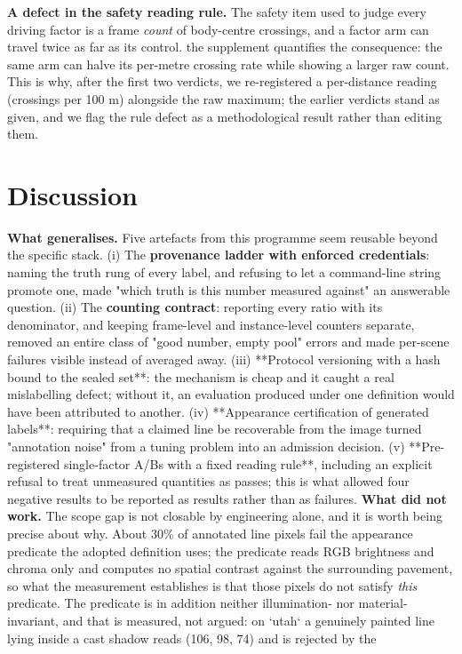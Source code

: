 \documentclass[journal]{IEEEtran}
\begin{document}
\textbf{A defect in the safety reading rule.} The safety item used to judge every driving factor is a frame
\emph{count} of body-centre crossings, and a factor arm can travel twice as far as its control. the supplement
quantifies the consequence: the same arm can halve its per-metre crossing rate while showing a larger
raw count. This is why, after the first two verdicts, we re-registered a per-distance reading
(crossings per 100 m) alongside the raw maximum; the earlier verdicts stand as given, and we flag the
rule defect as a methodological result rather than editing them.
\section{Discussion}
\textbf{What generalises.} Five artefacts from this programme seem reusable beyond the specific stack.
(i) The \textbf{provenance ladder with enforced credentials}: naming the truth rung of every label, and refusing
to let a command-line string promote one, made "which truth is this number measured against" an answerable
question. (ii) The \textbf{counting contract}: reporting every ratio with its denominator, and keeping frame-level
and instance-level counters separate, removed an entire class of "good number, empty pool" errors and made
per-scene failures visible instead of averaged away. (iii) **Protocol versioning with a hash bound to the
sealed set**: the mechanism is cheap and it caught a real mislabelling defect; without it, an evaluation
produced under one definition would have been attributed to another. (iv) **Appearance certification of
generated labels**: requiring that a claimed line be recoverable from the image turned "annotation noise"
from a tuning problem into an admission decision. (v) **Pre-registered single-factor A/Bs with a fixed
reading rule**, including an explicit refusal to treat unmeasured quantities as passes; this is what allowed
four negative results to be reported as results rather than as failures.
\textbf{What did not work.} The scope gap is not closable by engineering alone, and it is worth being precise
about why. About 30\% of annotated line pixels fail the appearance predicate the adopted definition uses;
the predicate reads RGB brightness and chroma only and computes no spatial contrast against the surrounding
pavement, so what the measurement establishes is that those pixels do not satisfy \emph{this} predicate. The
predicate is in addition neither illumination- nor material-invariant, and that is measured, not argued:
on `utah` a genuinely painted line lying inside a cast shadow reads (106, 98, 74) and is rejected by the
\end{document}
